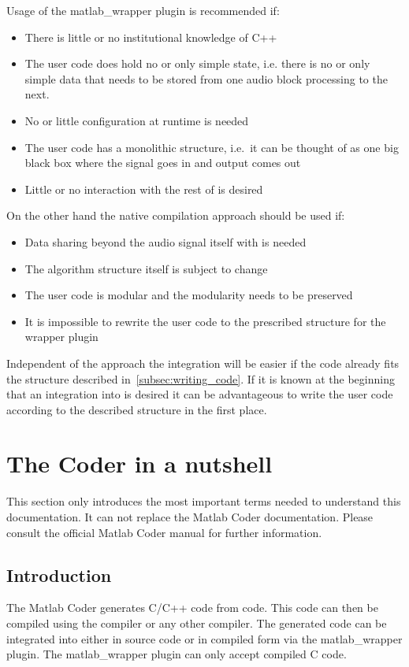 \documentclass[11pt,a4paper,twoside]{article}
\newcommand{\+}{\discretionary{\mbox{\scriptsize$\hookleftarrow$}}{}{}}
\begin{document}
Usage of the matlab\_wrapper plugin is recommended if:
\begin{itemize}
\item There is little or no institutional knowledge of C++
\item The user code does hold no or only simple state, i.e. there is no or only
  simple data that needs to be stored from one audio block processing to the next.
\item No or little configuration at runtime is needed
\item The user code has a monolithic structure, i.e.\ it can be thought of as
  one big black box where the signal goes in and output comes out
\item Little or no interaction with the rest of \mha{} is desired
\end{itemize}
On the other hand the native compilation approach should be used if:
\begin{itemize}
\item Data sharing beyond the audio signal itself with \mha{} is needed
\item The algorithm structure itself is subject to change
\item The user code is modular and the modularity needs to be preserved
\item It is impossible to rewrite the user code to the prescribed structure for
  the wrapper plugin
\end{itemize}
Independent of the approach the integration will be easier if the code already fits the
structure described in~\ref{subsec:writing_code}. If it is known at the beginning
that an integration into \mha{} is desired it can be advantageous to write the user
code according to the described structure in the first place.

\section{The \Matlab{} Coder in a nutshell}
This section only introduces the most important terms needed to understand this
documentation. It can not replace the Matlab Coder documentation.
Please consult the official Matlab Coder manual for further information.

\subsection*{Introduction}
The Matlab Coder generates C/C++ code from \Matlab{} code. This code can then be
compiled using the \Matlab{} compiler or any other compiler. The generated code
can be integrated into \mha{} either in source code or in compiled form via the
matlab\_wrapper plugin. The matlab\_wrapper plugin can only accept compiled C code.
\end{document}
